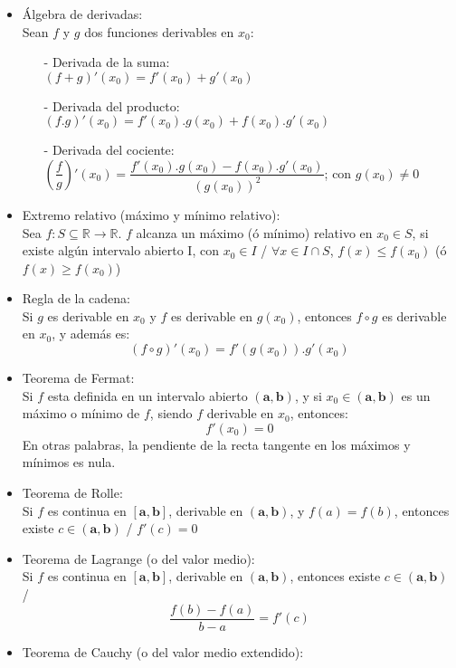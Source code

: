 \documentclass[a4paper,11pt]{report}
\begin{document}
\begin{itemize}
\begin{itemize}
\item Álgebra de derivadas: \\
Sean $f$ y $g$ dos funciones derivables en $x_0$:
\begin{itemize}
\item[-] Derivada de la suma:\\
$(f+g)'(x_0) = f'(x_0)+g'(x_0)$ \\[5pt]
\item[-] Derivada del producto: \\
$(f.g)'(x_0) = f'(x_0).g(x_0) + f(x_0).g'(x_0)$ \\[5pt]
\item[-] Derivada del cociente: \\
$(\dfrac{f}{g})'(x_0) = \dfrac{f'(x_0).g(x_0) - f(x_0).g'(x_0)}{(g(x_0))^2}$; con $g(x_0) \neq 0$ \\[5pt] 
\end{itemize}
\item Extremo relativo (máximo y mínimo relativo): \\
Sea $f:S\subseteq \mathbb{R} \to \mathbb{R}$. $f$ alcanza un máximo (ó mínimo) relativo en $x_0 \in S$, si existe algún intervalo abierto I, con $x_0 \in I$ / $\forall x \in I\cap S$, $f(x)\leqslant f(x_0)$ (ó $f(x)\geqslant f(x_0)$) 
\item Regla de la cadena: \\
Si $g$ es derivable en $x_0$ y $f$ es derivable en $g(x_0)$, entonces $f \circ g$ es derivable en $x_0$, y además es:
$$(f \circ g)'(x_0) = f'(g(x_0)).g'(x_0)$$
\item Teorema de Fermat: \\
Si $f$ esta definida en un intervalo abierto $\mathbf{(a,b)}$, y si $x_0 \in \mathbf{(a,b)}$ es un máximo o mínimo de $f$, siendo $f$ derivable en $x_0$, entonces: \\
$$f'(x_0) = 0$$
En otras palabras, la pendiente de la recta tangente en los máximos y mínimos es nula.  
\item Teorema de Rolle: \\
Si $f$ es continua en $\mathbf{[a,b]}$, derivable en $\mathbf{(a,b)}$, y $f(a)=f(b)$, entonces existe $c \in \mathbf{(a,b)}$ / $f'(c) =  0$
\item Teorema de Lagrange (o del valor medio):\\
Si $f$ es continua en $\mathbf{[a,b]}$, derivable en $\mathbf{(a,b)}$, entonces existe $c \in \mathbf{(a,b)}$ / \\
$$\frac{f(b)-f(a)}{b-a}=f'(c)$$
\item Teorema de Cauchy (o del valor medio extendido):\\

\end{itemize}
\end{itemize}
\end{document}

